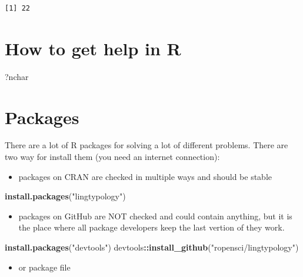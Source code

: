 \documentclass[]{book}
\newenvironment{Shaded}{\begin{snugshade}}{\end{snugshade}}
\newcommand{\KeywordTok}[1]{\textcolor[rgb]{0.13,0.29,0.53}{\textbf{#1}}}
\newcommand{\StringTok}[1]{\textcolor[rgb]{0.31,0.60,0.02}{#1}}
\newcommand{\OperatorTok}[1]{\textcolor[rgb]{0.81,0.36,0.00}{\textbf{#1}}}
\newcommand{\NormalTok}[1]{#1}
\providecommand{\tightlist}{%
  \setlength{\itemsep}{0pt}\setlength{\parskip}{0pt}}
\theoremstyle{definition}
\theoremstyle{definition}
\theoremstyle{definition}
\theoremstyle{remark}
\begin{document}
\begin{verbatim}
[1] 22
\end{verbatim}

\section{How to get help in R}\label{how-to-get-help-in-r}

\begin{Shaded}
\begin{Highlighting}[]
\NormalTok{?nchar}
\end{Highlighting}
\end{Shaded}

\section{Packages}\label{packages}

There are a lot of R packages for solving a lot of different problems.
There are two way for install them (you need an internet connection):

\begin{itemize}
\tightlist
\item
  packages on CRAN are checked in multiple ways and should be stable
\end{itemize}

\begin{Shaded}
\begin{Highlighting}[]
\KeywordTok{install.packages}\NormalTok{(}\StringTok{"lingtypology"}\NormalTok{)}
\end{Highlighting}
\end{Shaded}

\begin{itemize}
\tightlist
\item
  packages on GitHub are NOT checked and could contain anything, but it
  is the place where all package developers keep the last vertion of
  they work.
\end{itemize}

\begin{Shaded}
\begin{Highlighting}[]
\KeywordTok{install.packages}\NormalTok{(}\StringTok{"devtools"}\NormalTok{)}
\NormalTok{devtools}\OperatorTok{::}\KeywordTok{install_github}\NormalTok{(}\StringTok{"ropensci/lingtypology"}\NormalTok{)}
\end{Highlighting}
\end{Shaded}

\begin{itemize}
\tightlist
\item
  or package file
\end{itemize}
\end{document}
